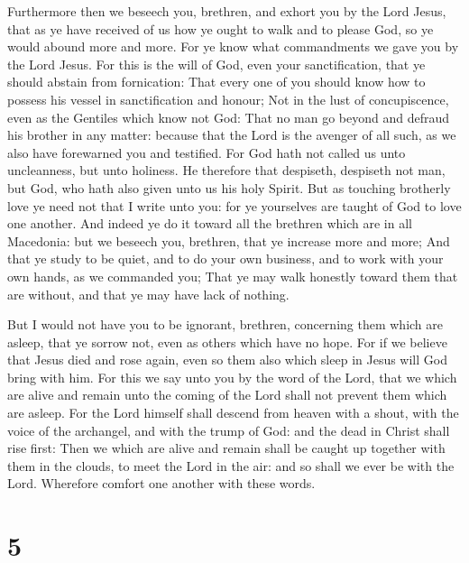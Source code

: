  Furthermore then we beseech you, brethren, and exhort you
by the Lord Jesus, that as ye have received of us how ye ought to walk
and to please God, so ye would abound more and more.  For ye
know what commandments we gave you by the Lord Jesus.  For
this is the will of God, even your sanctification, that ye should
abstain from fornication:  That every one of you should know
how to possess his vessel in sanctification and honour;  Not
in the lust of concupiscence, even as the Gentiles which know not God:
 That no man go beyond and defraud his brother in any
matter: because that the Lord is the avenger of all such, as we also
have forewarned you and testified.  For God hath not called
us unto uncleanness, but unto holiness.  He therefore that
despiseth, despiseth not man, but God, who hath also given unto us his
holy Spirit.  But as touching brotherly love ye need not
that I write unto you: for ye yourselves are taught of God to love one
another.  And indeed ye do it toward all the brethren which
are in all Macedonia: but we beseech you, brethren, that ye increase
more and more;  And that ye study to be quiet, and to do
your own business, and to work with your own hands, as we commanded you;
 That ye may walk honestly toward them that are without,
and that ye may have lack of nothing.

 But I would not have you to be ignorant, brethren,
concerning them which are asleep, that ye sorrow not, even as others
which have no hope.  For if we believe that Jesus died and
rose again, even so them also which sleep in Jesus will God bring with
him.  For this we say unto you by the word of the Lord,
that we which are alive and remain unto the coming of the Lord shall not
prevent them which are asleep.  For the Lord himself shall
descend from heaven with a shout, with the voice of the archangel, and
with the trump of God: and the dead in Christ shall rise first:
 Then we which are alive and remain shall be caught up
together with them in the clouds, to meet the Lord in the air: and so
shall we ever be with the Lord.  Wherefore comfort one
another with these words.

\hypertarget{section-4}{%
\section{5}\label{section-4}}

